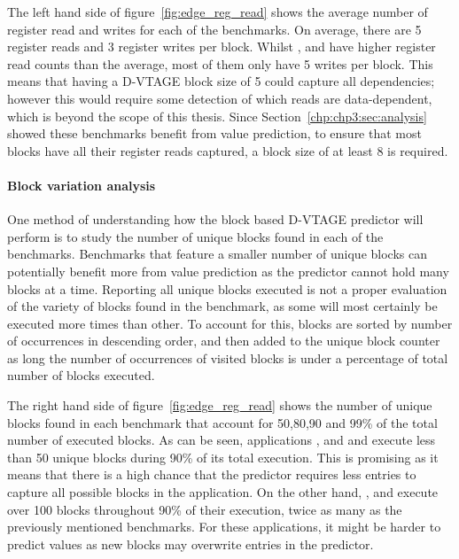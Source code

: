The left hand side of figure~\ref{fig:edge_reg_read} shows the average number of register read and writes for each of the benchmarks.
On average, there are 5 register reads and 3 register writes per block.
Whilst  ,  and  have higher register read counts than the average, most of them only have 5 writes per block.
This means that having a D-VTAGE block size of 5 could capture all dependencies; however this would require some detection of which reads are data-dependent, which is beyond the scope of this thesis.
Since Section~\ref{chp:chp3:sec:analysis} showed these benchmarks benefit from value prediction, to ensure that most blocks have all their register reads captured, a block size of at least 8 is required.

\paragraph*{Block variation analysis}



One method of understanding how the block based D-VTAGE predictor will perform is to study the number of unique blocks found in each of the benchmarks.
Benchmarks that feature a smaller number of unique blocks can potentially benefit more from value prediction as the predictor cannot hold many blocks at a time.
Reporting all unique blocks executed is not a proper evaluation of the variety of blocks found in the benchmark, as some will most certainly be executed more times than other.
To account for this, blocks are sorted by number of occurrences in descending order, and then added to the unique block counter as long the number of occurrences of visited blocks is under a percentage of total number of blocks executed.

The right hand side of figure~\ref{fig:edge_reg_read} shows the number of unique blocks found in each benchmark that account for 50,80,90 and 99\% of the total number of executed blocks.
As can be seen, applications ,  and   and  execute less than 50 unique blocks during 90\% of its total execution.
This is promising as it means that there is a high chance that the predictor requires less entries to capture all possible blocks in the application.
On the other hand, , and  execute over 100 blocks throughout 90\% of their execution, twice as many as the previously mentioned benchmarks.
For these applications, it might be harder to predict values as new blocks may overwrite entries in the predictor.


